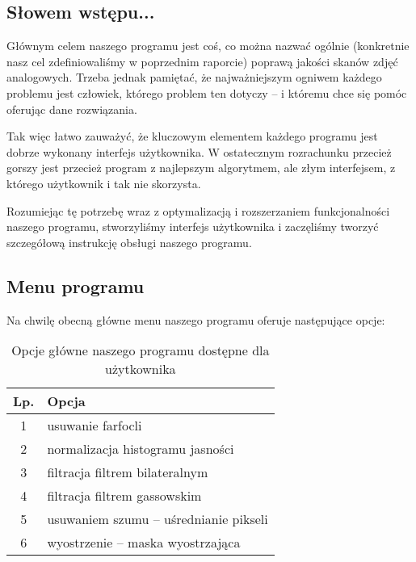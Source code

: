 \documentclass[]{mwart}
\begin{document}
\subsection{Słowem wstępu...}
Głównym celem naszego programu jest coś, co można nazwać
ogólnie (konkretnie nasz cel zdefiniowaliśmy w poprzednim raporcie)
poprawą jakości skanów zdjęć analogowych. Trzeba jednak pamiętać,
że najważniejszym ogniwem każdego problemu jest człowiek, którego
problem ten dotyczy -- i któremu chce się pomóc oferując dane rozwiązania. \newline

Tak więc łatwo zauważyć, że kluczowym elementem każdego programu jest dobrze wykonany
interfejs użytkownika. W ostatecznym rozrachunku przecież gorszy
jest przecież program z najlepszym algorytmem, ale złym interfejsem, z którego użytkownik i tak nie skorzysta. \newline


Rozumiejąc tę potrzebę wraz z optymalizacją i rozszerzaniem funkcjonalności
naszego programu, stworzyliśmy interfejs użytkownika i zaczęliśmy %
tworzyć szczegółową instrukcję obsługi naszego programu.

\subsection{Menu programu}
Na chwilę obecną główne menu naszego programu oferuje następujące opcje:

\begin{table}[h]
    \centering
    \begin{tabular}{|c|l|}
        \hline
        Lp. & Opcja                                  \\ \hline
        1   & usuwanie farfocli                      \\ \hline      %
        2   & normalizacja histogramu jasności       \\ \hline      %
        3   & filtracja filtrem bilateralnym         \\ \hline      %
        4   & filtracja filtrem gassowskim           \\ \hline      %
        5   & usuwaniem szumu -- uśrednianie pikseli \\ \hline      %
        6   & wyostrzenie -- maska wyostrzająca      \\ \hline      %
    \end{tabular}
    \caption{Opcje główne naszego programu dostępne dla użytkownika}
\end{table}
\end{document}
